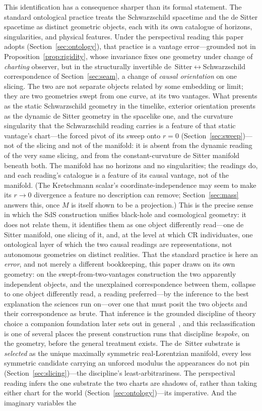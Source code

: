 \documentclass[11pt,a4paper]{article}
\theoremstyle{definition}
\begin{document}
This identification has a consequence sharper than its formal statement. The standard ontological practice treats the Schwarzschild spacetime and the de Sitter spacetime as distinct geometric objects, each with its own catalogue of horizons, singularities, and physical features. Under the perspectival reading this paper adopts (Section~\ref{sec:ontology}), that practice is a vantage error---grounded not in Proposition~\ref{prop:rigidity}, whose invariance fixes one geometry under change of \emph{charting} observer, but in the structurally invertible de~Sitter$\leftrightarrow$Schwarzschild correspondence of Section~\ref{sec:seam}, a change of \emph{causal orientation} on one slicing. The two are not separate objects related by some embedding or limit; they are two geometries swept from one curve, at its two vantages. What presents as the static Schwarzschild geometry in the timelike, exterior orientation presents as the dynamic de Sitter geometry in the spacelike one, and the curvature singularity that the Schwarzschild reading carries is a feature of that static vantage's chart---the forced pivot of its sweep onto $r=0$ (Section~\ref{sec:sweep})---not of the slicing and not of the manifold: it is absent from the dynamic reading of the very same slicing, and from the constant-curvature de Sitter manifold beneath both. The manifold has no horizons and no singularities; the readings do, and each reading's catalogue is a feature of its causal vantage, not of the manifold. (The Kretschmann scalar's coordinate-independence may seem to make its $r\to0$ divergence a feature no description can remove; Section~\ref{sec:mass} answers this, once $M$ is itself shown to be a projection.) This is the precise sense in which the SdS construction unifies black-hole and cosmological geometry: it does not relate them, it identifies them as one object differently read---one de Sitter manifold, one slicing of it, and, at the level at which CR individuates, one ontological layer of which the two causal readings are representations, not autonomous geometries on distinct realities. That the standard practice is here an \emph{error}, and not merely a different bookkeeping, this paper draws on its own geometry: on the swept-from-two-vantages construction the two apparently independent objects, and the unexplained correspondence between them, collapse to one object differently read, a reading preferred---by the inference to the best explanation the sciences run on---over one that must posit the two objects and their correspondence as brute. That inference is the grounded discipline of theory choice a companion foundation later sets out in general~\cite{JanzenShadowExistence}, and this reclassification is one of several places the present construction runs that discipline \emph{bespoke}, on the geometry, before the general treatment exists. The de~Sitter substrate is \emph{selected} as the unique maximally symmetric real-Lorentzian manifold, every less symmetric candidate carrying an unforced modulus the appearances do not pin (Section~\ref{sec:slicing})---the discipline's least-arbitrariness. The perspectival reading infers the one substrate the two charts are shadows of, rather than taking either chart for the world (Section~\ref{sec:ontology})---its imperative. And the imaginary variables the 
\end{document}
